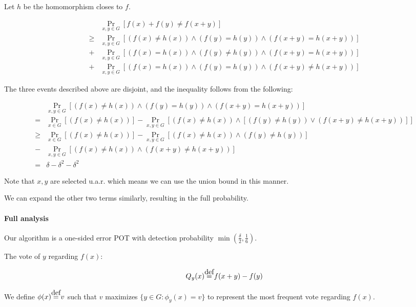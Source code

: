\documentclass{idc_msc}
\newcommand\defeq{\stackrel{\mathclap{\normalfont\mbox{def}}}{=}}
\begin{document}
Let \(h\) be the homomorphism closes to \(f\).

\[
\begin{aligned}
  & \Pr_{x, y \in G} [ f(x) + f(y) \ne f(x + y)] \\
  \ge& \Pr_{x, y \in G}[(f(x) \ne h(x)) \land (f(y) = h(y)) \land (f(x+y) = h(x + y))] \\
  +& \Pr_{x, y \in G}[(f(x) = h(x)) \land (f(y) \ne h(y)) \land (f(x+y) = h(x + y))] \\
  +& \Pr_{x, y \in G}[(f(x) = h(x)) \land (f(y) = h(y)) \land (f(x+y) \ne h(x + y))]
\end{aligned}
\]

The three events described above are disjoint, and the inequality follows from the following:

\[
\begin{aligned}
   &\Pr_{x, y \in G}[(f(x) \ne h(x)) \land (f(y) = h(y)) \land (f(x+y) = h(x + y))] \\
  =&\Pr_{x \in G}[(f(x) \ne h(x))] - \Pr_{x, y \in G}[(f(x) \ne h(x)) \land [(f(y) \ne h(y)) \lor (f(x+y) \ne h(x + y))]] \\
  \ge&\Pr_{x \in G}[(f(x) \ne h(x))] - \Pr_{x, y \in G}[(f(x) \ne h(x)) \land (f(y) \ne h(y))] \\
  -& \Pr_{x, y \in G}[(f(x) \ne h(x)) \land (f(x+y) \ne h(x+y))] \\
  =& \delta - \delta^2 - \delta^2
\end{aligned}
\]

Note that \(x, y\) are selected u.a.r. which means we can use the union bound in this manner.

We can expand the other two terms similarly, resulting in the full probability.

\paragraph{Full analysis}

Our algorithm is a one-sided error POT with detection probability \(\min(\frac{\delta}{2}, \frac{1}{6})\).

The vote of \(y\) regarding \(f(x)\):

\[
  Q_{y}(x) \defeq f(x+y) - f(y)
\]


We define \(\phi(x) \defeq v\) such that \(v\) maximizes \(\{y \in G : \phi_y(x) = v\}\) to represent the most frequent vote regarding \(f(x)\).
\end{document}
